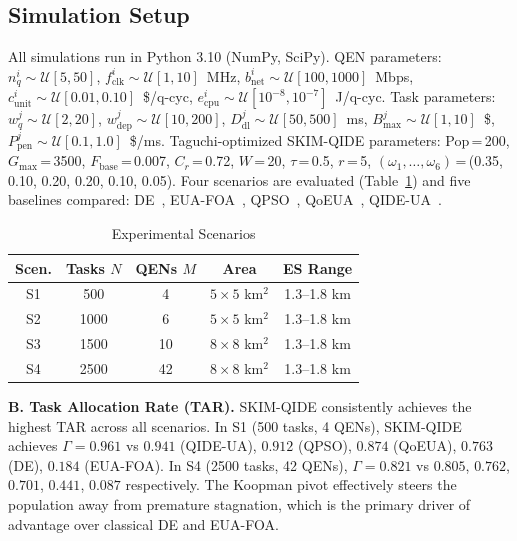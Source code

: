 \documentclass[10pt,twocolumn]{article}
\begin{document}
\subsection{Simulation Setup}
All simulations run in Python 3.10 (NumPy, SciPy). QEN parameters: $n^i_q\sim\mathcal{U}[5,50]$, $f^i_{\mathrm{clk}}\sim\mathcal{U}[1,10]$~MHz, $b^i_{\mathrm{net}}\sim\mathcal{U}[100,1000]$~Mbps, $c^i_{\mathrm{unit}}\sim\mathcal{U}[0.01,0.10]$~\$/q-cyc, $e^i_{\mathrm{cpu}}\sim\mathcal{U}[10^{-8},10^{-7}]$~J/q-cyc. Task parameters: $w^j_q\sim\mathcal{U}[2,20]$, $w^j_{\mathrm{dep}}\sim\mathcal{U}[10,200]$, $D^j_{\mathrm{dl}}\sim\mathcal{U}[50,500]$~ms, $B^j_{\mathrm{max}}\sim\mathcal{U}[1,10]$~\$, $P^j_{\mathrm{pen}}\sim\mathcal{U}[0.1,1.0]$~\$/ms. Taguchi-optimized SKIM-QIDE parameters: Pop\,=\,200, $G_{\max}$\,=\,3500, $F_{\mathrm{base}}$\,=\,0.007, $C_r$\,=\,0.72, $W$\,=\,20, $\tau$\,=\,0.5, $r$\,=\,5, $(\omega_1,\ldots,\omega_6)$\,=\,(0.35, 0.10, 0.20, 0.20, 0.10, 0.05). Four scenarios are evaluated (Table~\ref{tab:scenarios}) and five baselines compared: DE~\cite{ref7}, EUA-FOA~\cite{ref13}, QPSO~\cite{ref9}, QoEUA~\cite{ref12}, QIDE-UA~\cite{ref14}.

\begin{table}[t]
\centering\caption{Experimental Scenarios}\label{tab:scenarios}
\small\renewcommand{\arraystretch}{1.2}
\begin{tabular}{|c|c|c|c|c|}
\hline
Scen. & Tasks $N$ & QENs $M$ & Area & ES Range\\\hline
S1 & 500  & 4  & $5\!\times\!5$ km$^2$ & 1.3--1.8 km\\\hline
S2 & 1000 & 6  & $5\!\times\!5$ km$^2$ & 1.3--1.8 km\\\hline
S3 & 1500 & 10 & $8\!\times\!8$ km$^2$ & 1.3--1.8 km\\\hline
S4 & 2500 & 42 & $8\!\times\!8$ km$^2$ & 1.3--1.8 km\\\hline
\end{tabular}
\end{table}

\textbf{B. Task Allocation Rate (TAR).}
SKIM-QIDE consistently achieves the highest TAR across all scenarios. In S1 (500 tasks, 4 QENs), SKIM-QIDE achieves $\Gamma=0.961$ vs $0.941$ (QIDE-UA), $0.912$ (QPSO), $0.874$ (QoEUA), $0.763$ (DE), $0.184$ (EUA-FOA). In S4 (2500 tasks, 42 QENs), $\Gamma=0.821$ vs $0.805$, $0.762$, $0.701$, $0.441$, $0.087$ respectively. The Koopman pivot effectively steers the population away from premature stagnation, which is the primary driver of advantage over classical DE and EUA-FOA.
\end{document}
